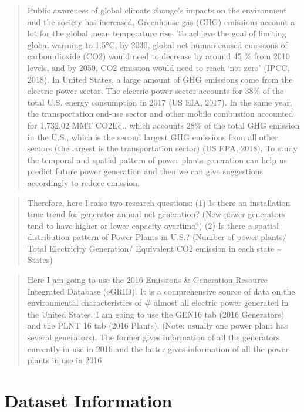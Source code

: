 \documentclass[12pt,]{article}
\begin{document}
\begin{quote}
Public awareness of global climate change's impacts on the environment
and the society has increased. Greenhouse gas (GHG) emissions account a
lot for the global mean temperature rise. To achieve the goal of
limiting global warming to 1.5°C, by 2030, global net human-caused
emissions of carbon dioxide (CO2) would need to decrease by around 45 \%
from 2010 levels, and by 2050, CO2 emission would need to reach `net
zero' (IPCC, 2018). In United States, a large amount of GHG emissions
come from the electric power sector. The electric power sector accounts
for 38\% of the total U.S. energy consumption in 2017 (US EIA, 2017). In
the same year, the transportation end-use sector and other mobile
combustion accounted for 1,732.02 MMT CO2Eq., which accounts 28\% of the
total GHG emission in the U.S., which is the second largest GHG
emissions from all other sectors (the largest is the transportation
sector) (US EPA, 2018). To study the temporal and spatial pattern of
power plants generation can help us predict future power generation and
then we can give suggestions accordingly to reduce emission.
\end{quote}

\begin{quote}
Therefore, here I raise two research questions: (1) Is there an
installation time trend for generator annual net generation? (New power
generators tend to have higher or lower capacity overtime?) (2) Is there
a spatial distribution pattern of Power Plants in U.S.? (Number of power
plants/ Total Electricity Generation/ Equivalent CO2 emission in each
state \textasciitilde{} States)
\end{quote}

\begin{quote}
Here I am going to use the 2016 Emissions \& Generation Resource
Integrated Database (eGRID). It is a comprehensive source of data on the
environmental characteristics of \# almost all electric power generated
in the United States. I am going to use the GEN16 tab (2016 Generators)
and the PLNT 16 tab (2016 Plants). (Note: usually one power plant has
several generators). The former gives information of all the generators
currently in use in 2016 and the latter gives information of all the
power plants in use in 2016.
\end{quote}

\newpage

\section{Dataset Information}\label{dataset-information}
\end{document}
